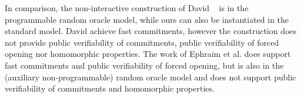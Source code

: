


In comparison, the non-interactive construction of David \etal~\cite{EC:BDDNO21} is in the programmable random oracle model, while ours can also be instantiated in the standard model. David \etal achieve fast commitments, however the construction does not provide public verifiability of commitments, public verifiability of forced opening nor homomorphic properties. The work of Ephraim et al. \cite{EPRINT:EFKP20a} does support fast commitments and public verifiability of forced opening, but is also in the (auxiliary non-programmable) random oracle model and does not support public verifiability of commitments and homomorphic properties.



